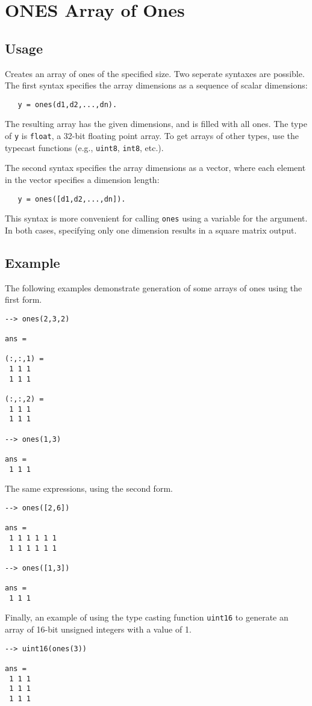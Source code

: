 \section{ONES Array of Ones}

\subsection{Usage}

Creates an array of ones of the specified size.  Two seperate 
syntaxes are possible.  The first syntax specifies the array 
dimensions as a sequence of scalar dimensions:
\begin{verbatim}
   y = ones(d1,d2,...,dn).
\end{verbatim}
The resulting array has the given dimensions, and is filled with
all ones.  The type of \verb|y| is \verb|float|, a 32-bit floating
point array.  To get arrays of other types, use the typecast 
functions (e.g., \verb|uint8|, \verb|int8|, etc.).
    
The second syntax specifies the array dimensions as a vector,
where each element in the vector specifies a dimension length:
\begin{verbatim}
   y = ones([d1,d2,...,dn]).
\end{verbatim}
This syntax is more convenient for calling \verb|ones| using a 
variable for the argument.  In both cases, specifying only one
dimension results in a square matrix output.
\subsection{Example}

The following examples demonstrate generation of some arrays of ones
using the first form.
\begin{verbatim}
--> ones(2,3,2)

ans = 

(:,:,1) = 
 1 1 1 
 1 1 1 

(:,:,2) = 
 1 1 1 
 1 1 1 

--> ones(1,3)

ans = 
 1 1 1 
\end{verbatim}
The same expressions, using the second form.
\begin{verbatim}
--> ones([2,6])

ans = 
 1 1 1 1 1 1 
 1 1 1 1 1 1 

--> ones([1,3])

ans = 
 1 1 1 
\end{verbatim}
Finally, an example of using the type casting function \verb|uint16| to generate an array of 16-bit unsigned integers with a value of 1.
\begin{verbatim}
--> uint16(ones(3))

ans = 
 1 1 1 
 1 1 1 
 1 1 1 
\end{verbatim}
